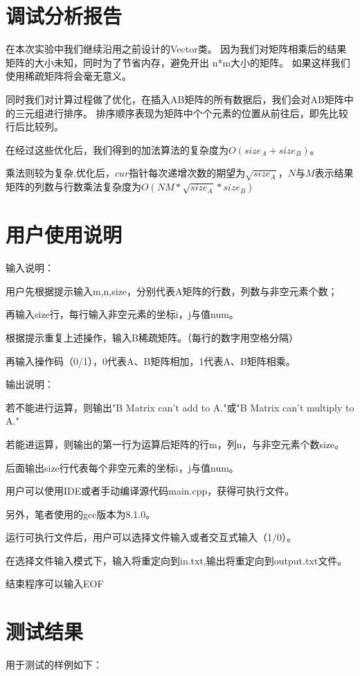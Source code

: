 \newpage

\section{调试分析报告}

   在本次实验中我们继续沿用之前设计的Vector类。
   因为我们对矩阵相乘后的结果矩阵的大小未知，同时为了节省内存，避免开出 n*m大小的矩阵。
   如果这样我们使用稀疏矩阵将会毫无意义。


   同时我们对计算过程做了优化，在插入AB矩阵的所有数据后，我们会对AB矩阵中的三元组进行排序。
   排序顺序表现为矩阵中个个元素的位置从前往后，即先比较行后比较列。


   在经过这些优化后，我们得到的加法算法的复杂度为$O(size_A + size_B)$。


   乘法则较为复杂,优化后，$cur$指针每次递增次数的期望为$\sqrt{size_A}$，$N$与$M$表示结果矩阵的列数与行数乘法复杂度为$O(NM*\sqrt{size_A}*size_B)$

\section{用户使用说明}
输入说明：

用户先根据提示输入m,n,size，分别代表A矩阵的行数，列数与非空元素个数；

再输入size行，每行输入非空元素的坐标i，j与值num。

根据提示重复上述操作，输入B稀疏矩阵。（每行的数字用空格分隔）

再输入操作码（0/1），0代表A、B矩阵相加，1代表A、B矩阵相乘。

输出说明：

若不能进行运算，则输出"B Matrix can't add to A."或"B Matrix can't multiply to A."

若能进运算，则输出的第一行为运算后矩阵的行m，列n，与非空元素个数size。

后面输出size行代表每个非空元素的坐标i，j与值num。

用户可以使用IDE或者手动编译源代码main.cpp，获得可执行文件。

另外，笔者使用的gcc版本为8.1.0。   

运行可执行文件后，用户可以选择文件输入或者交互式输入（1/0）。

在选择文件输入模式下，输入将重定向到in.txt,输出将重定向到output.txt文件。

结束程序可以输入EOF

\section{测试结果}
用于测试的样例如下：

